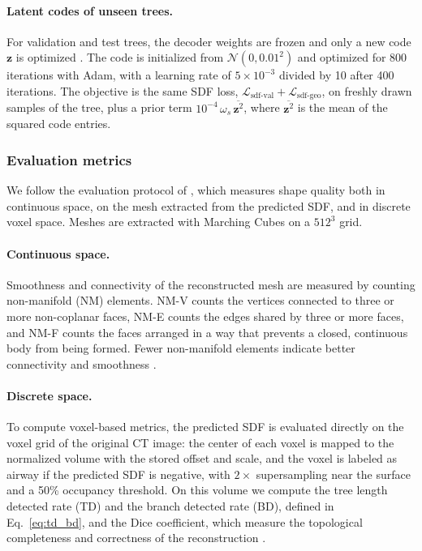 \paragraph{Latent codes of unseen trees.}  %
\label{sec:implicit_inference}           %
For validation and test trees, the decoder weights are frozen and only a new code
$\mathbf{z}$ is optimized \cite{park2019}. The code is initialized from
$\mathcal{N}(0, 0.01^2)$ and optimized for 800 iterations with Adam, with a learning rate of
$5\times10^{-3}$ divided by 10 after 400 iterations. The objective is the same SDF loss,
$\mathcal{L}_{\mathrm{sdf\text{-}val}} + \mathcal{L}_{\mathrm{sdf\text{-}geo}}$, on freshly
drawn samples of the tree, plus a prior term
$10^{-4}\,\omega_s \,\overline{\mathbf{z}^2}$, where $\overline{\mathbf{z}^2}$ is the mean of
the squared code entries.

\subsubsection{Evaluation metrics}       %
\label{sec:implicit_metrics}             %
\label{sec:dgci_metrics}                 %

We follow the evaluation protocol of \citet{zhang2024}, which measures shape quality both in
continuous space, on the mesh extracted from the predicted SDF, and in discrete voxel space.
Meshes are extracted with Marching Cubes on a $512^3$ grid.

\paragraph{Continuous space.}            %
Smoothness and connectivity of the reconstructed mesh are measured by counting non-manifold
(NM) elements. NM-V counts the vertices connected to three or more non-coplanar faces, NM-E
counts the edges shared by three or more faces, and NM-F counts the faces arranged in a way
that prevents a closed, continuous body from being formed. Fewer non-manifold elements
indicate better connectivity and smoothness \cite{zhang2024}.

\paragraph{Discrete space.}              %
To compute voxel-based metrics, the predicted SDF is evaluated directly on the voxel grid of
the original CT image: the center of each voxel is mapped to the normalized volume with the
stored offset and scale, and the voxel is labeled as airway if the predicted SDF is negative,
with $2\times$ supersampling near the surface and a 50\% occupancy threshold. On this
volume we compute the tree length detected rate (TD) and the branch detected rate (BD),
defined in Eq.~\eqref{eq:td_bd}, and the Dice coefficient, which measure the topological
completeness and correctness of the reconstruction \cite{zhang2024}.

